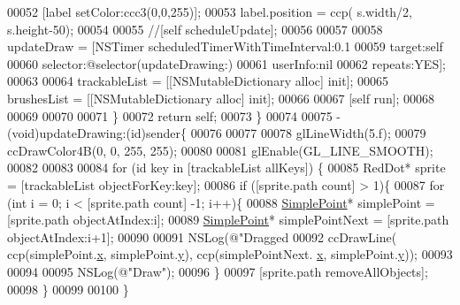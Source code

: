 \begin{DoxyCode}
00052         [label setColor:ccc3(0,0,255)];
00053         label.position = ccp( s.width/2, s.height-50);
00054         
00055         \textcolor{comment}{//[self scheduleUpdate];}
00056         
00057         
00058         updateDraw = [NSTimer scheduledTimerWithTimeInterval:0.1
00059                                          target:self
00060                                        selector:@selector(updateDrawing:)
00061                                        userInfo:nil
00062                                         repeats:YES];
00063         
00064         trackableList = [[NSMutableDictionary alloc] init];
00065         brushesList = [[NSMutableDictionary alloc] init];
00066         
00067         [\textcolor{keyword}{self} run];
00068         
00069     
00070         
00071     \}
00072     \textcolor{keywordflow}{return} \textcolor{keyword}{self};
00073 \}
00074 
00075 - (void)updateDrawing:(\textcolor{keywordtype}{id})sender\{
00076     
00077     
00078     glLineWidth(5.f);
00079     ccDrawColor4B(0, 0, 255, 255);
00080     
00081     glEnable(GL\_LINE\_SMOOTH);
00082     
00083     
00084     \textcolor{keywordflow}{for} (\textcolor{keywordtype}{id} key in [trackableList allKeys]) \{
00085         RedDot* sprite = [trackableList objectForKey:key];
00086         \textcolor{keywordflow}{if} ([sprite.path count] > 1)\{
00087             \textcolor{keywordflow}{for} (\textcolor{keywordtype}{int} i = 0;  i < [sprite.path count] -1; i++)\{
00088                 \hyperlink{interface_simple_point}{SimplePoint}* simplePoint =  [sprite.path objectAtIndex:i];
00089                 \hyperlink{interface_simple_point}{SimplePoint}* simplePointNext = [sprite.path objectAtIndex:i+1];
00090                 
00091                 NSLog(\textcolor{stringliteral}{@"Dragged %
00092                 ccDrawLine( ccp(simplePoint.\hyperlink{interface_simple_point_abb16aaf6215e9e946606b30199b1c3af}{x}, simplePoint.\hyperlink{interface_simple_point_ae10ba2c5156e6061258a0720443cd1c8}{y}), ccp(simplePointNext.
      \hyperlink{interface_simple_point_abb16aaf6215e9e946606b30199b1c3af}{x}, simplePoint.\hyperlink{interface_simple_point_ae10ba2c5156e6061258a0720443cd1c8}{y}));
00093                 
00094                 
00095                 NSLog(\textcolor{stringliteral}{@"Draw"});
00096             \}
00097             [sprite.path removeAllObjects];
00098         \}
00099         
00100     \}
}
\end{DoxyCode}
